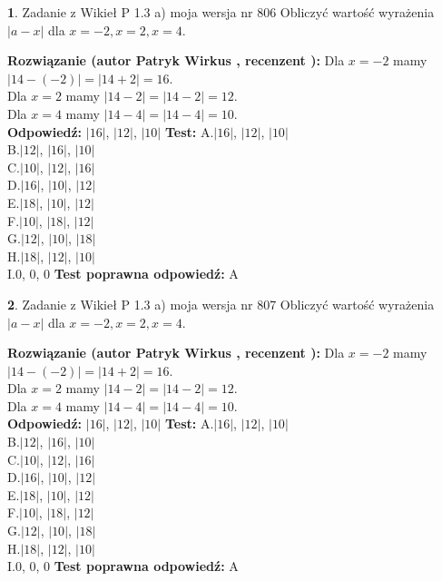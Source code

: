 \documentclass[12pt, a4paper]{article}
\theoremstyle{definition} %
\newtheorem{zad}{}
\newcommand{\zadStart}[1]{\begin{zad}#1\newline}
\newcommand{\zadStop}{\end{zad}}
\newcommand{\rozwStart}[2]{\noindent \textbf{Rozwiązanie (autor #1 , recenzent #2): }\newline}
\newcommand{\rozwStop}{\newline}
\newcommand{\odpStart}{\noindent \textbf{Odpowiedź:}\newline}
\newcommand{\odpStop}{\newline}
\newcommand{\testStart}{\noindent \textbf{Test:}\newline}
\newcommand{\testStop}{\newline}
\newcommand{\kluczStart}{\noindent \textbf{Test poprawna odpowiedź:}\newline}
\newcommand{\kluczStop}{\newline}
\begin{document}
\zadStart{Zadanie z Wikieł P 1.3 a) moja wersja nr 806}
Obliczyć wartość wyrażenia $|a - x|$ dla $x=-2,x=2,x=4$.
\zadStop
\rozwStart{Patryk Wirkus}{}
Dla $x = -2$ mamy $|14 - (-2)| = |14 + 2| = 16$.\\
Dla $x = 2$ mamy $|14 - 2| = |14 - 2| = 12$.\\
Dla $x = 4$ mamy $|14 - 4| = |14 - 4| = 10$.\\
\rozwStop
\odpStart
$|16|$, $|12|$, $|10|$
\odpStop
\testStart
A.$|16|$, $|12|$, $|10|$\\
B.$|12|$, $|16|$, $|10|$\\
C.$|10|$, $|12|$, $|16|$\\
D.$|16|$, $|10|$, $|12|$\\
E.$|18|$, $|10|$, $|12|$\\
F.$|10|$, $|18|$, $|12|$\\
G.$|12|$, $|10|$, $|18|$\\
H.$|18|$, $|12|$, $|10|$\\
I.$0$, $0$, $0$
\testStop
\kluczStart
A
\kluczStop



\zadStart{Zadanie z Wikieł P 1.3 a) moja wersja nr 807}
Obliczyć wartość wyrażenia $|a - x|$ dla $x=-2,x=2,x=4$.
\zadStop
\rozwStart{Patryk Wirkus}{}
Dla $x = -2$ mamy $|14 - (-2)| = |14 + 2| = 16$.\\
Dla $x = 2$ mamy $|14 - 2| = |14 - 2| = 12$.\\
Dla $x = 4$ mamy $|14 - 4| = |14 - 4| = 10$.\\
\rozwStop
\odpStart
$|16|$, $|12|$, $|10|$
\odpStop
\testStart
A.$|16|$, $|12|$, $|10|$\\
B.$|12|$, $|16|$, $|10|$\\
C.$|10|$, $|12|$, $|16|$\\
D.$|16|$, $|10|$, $|12|$\\
E.$|18|$, $|10|$, $|12|$\\
F.$|10|$, $|18|$, $|12|$\\
G.$|12|$, $|10|$, $|18|$\\
H.$|18|$, $|12|$, $|10|$\\
I.$0$, $0$, $0$
\testStop
\kluczStart
A
\kluczStop
\end{document}

